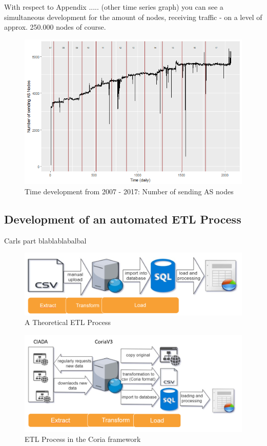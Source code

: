 \documentclass[conference]{IEEEtran}
\begin{document}
With respect to Appendix ..... (other time series graph) you can see a simultaneous development for the amount of nodes, receiving traffic - on a level of approx. 250.000 nodes of course. 




\begin{figure}[htbp]
\centerline{\includegraphics[scale=0.4]{Graphics/ASFromAll.png}}
\caption{Time development from 2007 - 2017: Number of sending AS nodes}
\label{fig}
\end{figure}


\subsection{Development of an automated ETL Process}

Carls part blablablabalbal



\begin{figure}[htbp]
\centerline{\includegraphics[scale=0.29]{Graphics/ETL1.PNG}}
\caption{A Theoretical ETL Process}
\label{fig}
\end{figure}

\begin{figure}[htbp]
\centerline{\includegraphics[scale=0.4]{Graphics/ETL2.PNG}}
\caption{ETL Process in the Coria framework}
\label{fig}
\end{figure}
\end{document}
